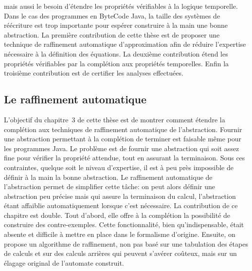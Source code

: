 mais aussi le besoin d'étendre les propriétés vérifiables à la logique temporelle.
Dans le cas des programmes en ByteCode Java, la taille des systèmes de réécriture est trop importante
pour espérer construire à la main une bonne abstraction. La première contribution de cette thèse est de
proposer une technique de raffinement automatique d'approximation
afin de réduire l'expertise nécessaire à la définition des équations.
La deuxième contribution étend les propriétés vérifiables par la complétion aux propriétés temporelles.
Enfin la troisième contribution est de certifier les analyses effectuées.



\bigskip
\subsection*{Le raffinement automatique} 
L'objectif du chapitre~3 de cette thèse est de montrer comment étendre la complétion
aux techniques de raffinement automatique de l'abstraction. Fournir une abstraction permettant à la complétion
de terminer est faisable même pour les programmes Java. Le problème est de fournir une abstraction qui soit assez
fine pour vérifier la propriété attendue, tout en assurant la terminaison. Sous ces contraintes, quelque soit
le niveau d'expertise, il est à peu près impossible de définir à la main la bonne abstraction. Le raffinement automatique
de l'abstraction permet de simplifier cette tâche: on peut alors définir une abstraction peu précise mais qui assure
la terminaison du calcul, l'abstraction étant affaiblie automatiquement lorsque c'est nécessaire.
La contribution de ce chapitre est double. Tout d'abord, elle offre à la complétion la possibilité de
construire des contre-exemples. Cette fonctionnalité, bien qu'indispensable, était absente et difficile à mettre
en place dans le formalisme d'origine. Ensuite, on propose un algorithme de raffinement, non pas basé 
sur une tabulation des étapes de calculs et sur des calculs arrières qui peuvent s'avérer coûteux, mais sur un élagage 
original de l'automate construit. 

